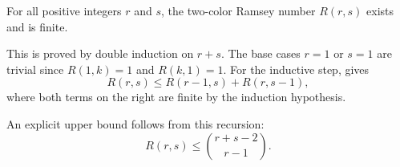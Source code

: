 \begin{theorem} \label{theorem:finite_ramseys_theorem_existence_of_two_color_ramsey_numbers}
For all positive integers $r$ and $s$, the two-color Ramsey number $R(r,s)$ exists and is finite.

This is proved by double induction on $r+s$. The base cases $r=1$ or $s=1$ are trivial since $R(1,k) = 1$ and $R(k,1) = 1$. For the inductive step,  gives
$$R(r,s) \leq R(r-1,s) + R(r,s-1),$$
where both terms on the right are finite by the induction hypothesis.

An explicit upper bound follows from this recursion:
$$R(r,s) \leq \binom{r+s-2}{r-1}.$$
\end{theorem}
